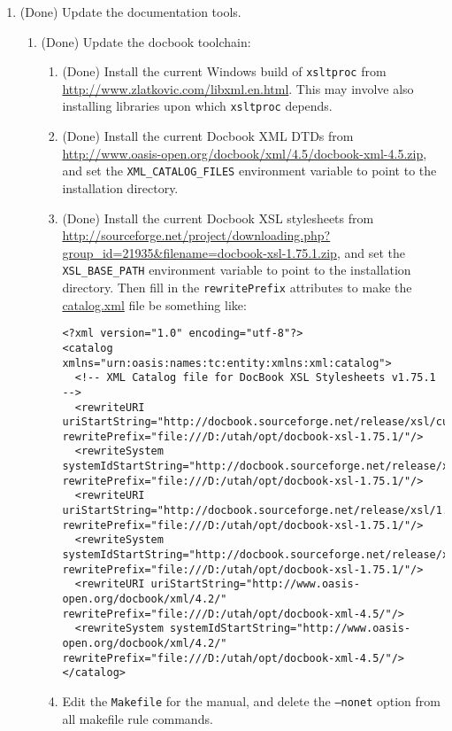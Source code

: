 \documentclass[11pt,letterpaper,onecolumn]{scrartcl}
\begin{document}
\begin{sloppypar}
\begin{enumerate}
	\item (Done) Update the documentation tools.
		\begin{enumerate}
	    \item (Done) Update the docbook toolchain:
				\begin{enumerate}
					\item (Done) Install the current Windows build of \texttt{xsltproc} from \url{http://www.zlatkovic.com/libxml.en.html}. This may involve also installing libraries upon which \texttt{xsltproc} depends.
					\item (Done) Install the current Docbook XML DTDs from \url{http://www.oasis-open.org/docbook/xml/4.5/docbook-xml-4.5.zip}, and set the \verb|XML_CATALOG_FILES| environment variable to point to the installation directory.
					\item (Done) Install the current Docbook XSL stylesheets from \url{http://sourceforge.net/project/downloading.php?group_id=21935&filename=docbook-xsl-1.75.1.zip}, and set the \verb|XSL_BASE_PATH| environment variable to point to the installation directory. Then fill in the \texttt{rewritePrefix} attributes to make the \url{catalog.xml} file be something like:
					\begin{lstlisting}
<?xml version="1.0" encoding="utf-8"?>
<catalog xmlns="urn:oasis:names:tc:entity:xmlns:xml:catalog">
  <!-- XML Catalog file for DocBook XSL Stylesheets v1.75.1 -->
  <rewriteURI uriStartString="http://docbook.sourceforge.net/release/xsl/current/" rewritePrefix="file:///D:/utah/opt/docbook-xsl-1.75.1/"/>
  <rewriteSystem systemIdStartString="http://docbook.sourceforge.net/release/xsl/current/" rewritePrefix="file:///D:/utah/opt/docbook-xsl-1.75.1/"/>
  <rewriteURI uriStartString="http://docbook.sourceforge.net/release/xsl/1.75.1/" rewritePrefix="file:///D:/utah/opt/docbook-xsl-1.75.1/"/>
  <rewriteSystem systemIdStartString="http://docbook.sourceforge.net/release/xsl/1.75.1/" rewritePrefix="file:///D:/utah/opt/docbook-xsl-1.75.1/"/>
  <rewriteURI uriStartString="http://www.oasis-open.org/docbook/xml/4.2/" rewritePrefix="file:///D:/utah/opt/docbook-xml-4.5/"/>
  <rewriteSystem systemIdStartString="http://www.oasis-open.org/docbook/xml/4.2/" rewritePrefix="file:///D:/utah/opt/docbook-xml-4.5/"/>
</catalog>
					\end{lstlisting}
					\item Edit the \texttt{Makefile} for the manual, and delete the \texttt{--nonet} option from all makefile rule commands.
				\end{enumerate}


\end{enumerate}
\end{enumerate}
\end{sloppypar}
\end{document}
